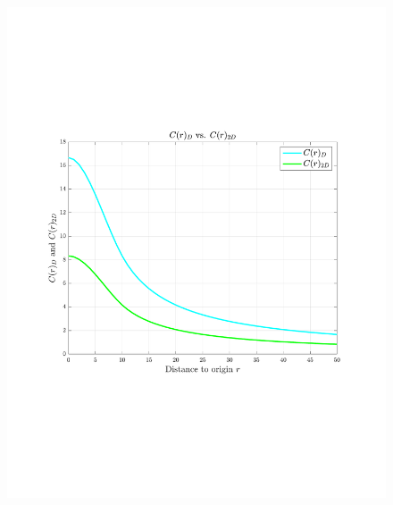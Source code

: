 \documentclass[12pt,twoside]{article}
\begin{document}
\begin{figure}[H]
 \centering
 \includegraphics[scale=0.5]{concentration_d_2d}
\end{figure}

\ee
\end{document}
